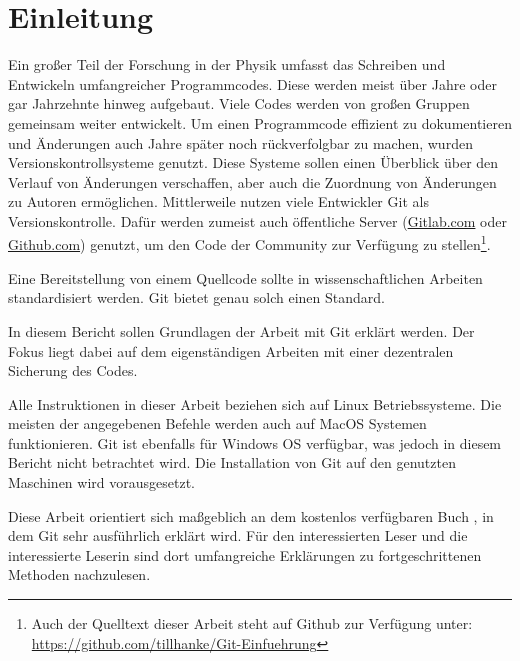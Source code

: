 \section{Einleitung}
Ein großer Teil der Forschung in der Physik umfasst das Schreiben und Entwickeln umfangreicher Programmcodes. Diese werden meist über Jahre oder gar Jahrzehnte hinweg aufgebaut. Viele Codes werden von großen Gruppen gemeinsam weiter entwickelt. Um einen Programmcode effizient zu dokumentieren und Änderungen auch Jahre später noch rückverfolgbar zu machen, wurden Versionskontrollsysteme genutzt. Diese Systeme sollen einen Überblick über den Verlauf von Änderungen verschaffen, aber auch die Zuordnung von Änderungen zu Autoren ermöglichen. Mittlerweile nutzen viele Entwickler Git als Versionskontrolle. Dafür werden zumeist auch öffentliche Server (\url{Gitlab.com} oder \url{Github.com}) genutzt, um den Code der Community zur Verfügung zu stellen\footnote{Auch der Quelltext dieser Arbeit steht auf Github zur Verfügung unter: {\url{https://github.com/tillhanke/Git-Einfuehrung}}}. 

Eine Bereitstellung von einem Quellcode sollte in wissenschaftlichen Arbeiten standardisiert werden. Git bietet genau solch einen Standard.

In diesem Bericht sollen Grundlagen der Arbeit mit Git erklärt werden. Der Fokus liegt dabei auf dem eigenständigen Arbeiten mit einer dezentralen Sicherung des Codes.

Alle Instruktionen in dieser Arbeit beziehen sich auf Linux Betriebssysteme. Die meisten der angegebenen Befehle werden auch auf MacOS Systemen funktionieren. Git ist ebenfalls für Windows OS verfügbar, was jedoch in diesem Bericht nicht betrachtet wird. Die Installation von Git auf den genutzten Maschinen wird vorausgesetzt.

Diese Arbeit orientiert sich maßgeblich an dem kostenlos verfügbaren Buch \cite{ProGit}, in dem Git sehr ausführlich erklärt wird. Für den interessierten Leser und die interessierte Leserin sind dort umfangreiche Erklärungen zu fortgeschrittenen Methoden nachzulesen.

